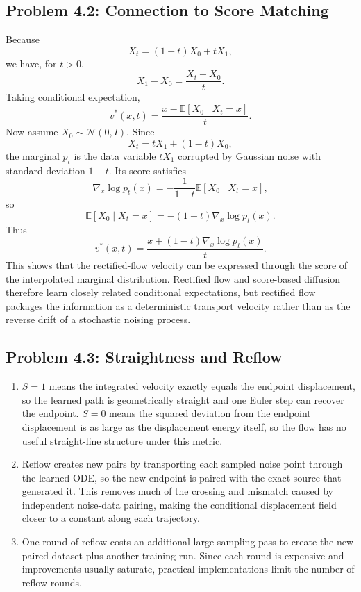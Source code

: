 \documentclass[11pt]{article}
\newcommand{\E}{\mathbb{E}}
\newcommand{\N}{\mathcal{N}}
\newcommand{\Id}{I}
\begin{document}
\subsection*{Problem 4.2: Connection to Score Matching}
Because
\[
X_t=(1-t)X_0+tX_1,
\]
we have, for $t>0$,
\[
X_1-X_0=\frac{X_t-X_0}{t}.
\]
Taking conditional expectation,
\[
v^*(x,t)=\frac{x-\E[X_0\mid X_t=x]}{t}.
\]
Now assume $X_0\sim\N(0,\Id)$.  Since
\[
X_t=tX_1+(1-t)X_0,
\]
the marginal $p_t$ is the data variable $tX_1$ corrupted by Gaussian noise with standard deviation $1-t$.  Its score satisfies
\[
\nabla_x\log p_t(x)
=-\frac{1}{1-t}\E[X_0\mid X_t=x],
\]
so
\[
\E[X_0\mid X_t=x]=-(1-t)\nabla_x\log p_t(x).
\]
Thus
\[
v^*(x,t)=\frac{x+(1-t)\nabla_x\log p_t(x)}{t}.
\]
This shows that the rectified-flow velocity can be expressed through the score of the interpolated marginal distribution.  Rectified flow and score-based diffusion therefore learn closely related conditional expectations, but rectified flow packages the information as a deterministic transport velocity rather than as the reverse drift of a stochastic noising process.

\subsection*{Problem 4.3: Straightness and Reflow}
\begin{enumerate}[label=(\arabic*)]
\item $S=1$ means the integrated velocity exactly equals the endpoint displacement, so the learned path is geometrically straight and one Euler step can recover the endpoint.  $S=0$ means the squared deviation from the endpoint displacement is as large as the displacement energy itself, so the flow has no useful straight-line structure under this metric.
\item Reflow creates new pairs by transporting each sampled noise point through the learned ODE, so the new endpoint is paired with the exact source that generated it.  This removes much of the crossing and mismatch caused by independent noise-data pairing, making the conditional displacement field closer to a constant along each trajectory.
\item One round of reflow costs an additional large sampling pass to create the new paired dataset plus another training run.  Since each round is expensive and improvements usually saturate, practical implementations limit the number of reflow rounds.
\end{enumerate}
\end{document}
